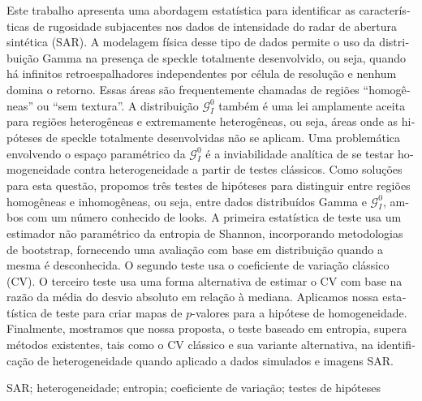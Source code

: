 \begin{otherlanguage}{portuguese} 


\begin{resumo}
{}

Este trabalho apresenta uma abordagem estatística para identificar as características de rugosidade subjacentes nos dados de intensidade do radar de abertura sintética (SAR). 
A modelagem física desse tipo de dados permite o uso da distribuição Gamma na presença de speckle totalmente desenvolvido, ou seja, quando há infinitos retroespalhadores independentes por célula de resolução e nenhum domina o retorno.
Essas áreas são frequentemente chamadas de regiões ``homogêneas'' ou ``sem textura''. 
A distribuição $\mathcal{G}_I^0$ também é uma lei amplamente aceita para regiões heterogêneas e extremamente heterogêneas, ou seja, áreas onde as hipóteses de speckle totalmente desenvolvidas não se aplicam.
Uma problemática envolvendo o espaço paramétrico da $\mathcal{G}_I^0$ é a inviabilidade analítica de se testar homogeneidade contra heterogeneidade a partir de testes clássicos. 
Como soluções para esta questão, propomos três testes de hipóteses  para distinguir entre regiões homogêneas e inhomogêneas, ou seja, entre dados distribuídos Gamma e $\mathcal{G}_I^0$, ambos com um número conhecido de looks.
A primeira estatística de teste usa um estimador não paramétrico da entropia de Shannon, incorporando metodologias de bootstrap, fornecendo uma avaliação com base em distribuição quando a mesma é desconhecida.
O segundo teste usa o coeficiente de variação clássico (CV). 
O terceiro teste usa uma forma alternativa de estimar o CV com base na razão da média do desvio absoluto em relação à mediana.
Aplicamos nossa estatística de teste para criar mapas de $p$-valores para a hipótese de homogeneidade. 
Finalmente, mostramos que nossa proposta, o teste baseado em entropia, supera métodos existentes, tais como o CV clássico e sua variante alternativa, na identificação de heterogeneidade quando aplicado a dados simulados e imagens SAR.


\end{resumo}

\begin{keywords}
SAR; heterogeneidade; entropia; coeficiente de variação; testes de hipóteses
\end{keywords}


\end{otherlanguage}

